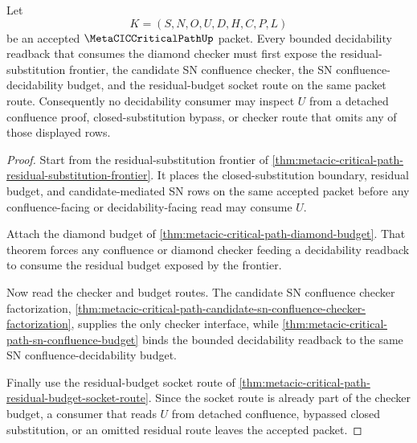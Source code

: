 \begin{theorem}
\label{thm:metacic-critical-path-residual-decidability-cut}
Let
$$
K=(S,N,O,U,D,H,C,P,L)
$$
be an accepted $\MetaCICCriticalPathUp$ packet. Every bounded decidability readback that consumes the diamond checker must first expose the residual-substitution frontier, the candidate SN confluence checker, the SN confluence-decidability budget, and the residual-budget socket route on the same packet route. Consequently no decidability consumer may inspect $U$ from a detached confluence proof, closed-substitution bypass, or checker route that omits any of those displayed rows.
\end{theorem}
\begin{proof}
Start from the residual-substitution frontier of \autoref{thm:metacic-critical-path-residual-substitution-frontier}. It places the closed-substitution boundary, residual budget, and candidate-mediated SN rows on the same accepted packet before any confluence-facing or decidability-facing read may consume $U$.

Attach the diamond budget of \autoref{thm:metacic-critical-path-diamond-budget}. That theorem forces any confluence or diamond checker feeding a decidability readback to consume the residual budget exposed by the frontier.

Now read the checker and budget routes. The candidate SN confluence checker factorization, \autoref{thm:metacic-critical-path-candidate-sn-confluence-checker-factorization}, supplies the only checker interface, while \autoref{thm:metacic-critical-path-sn-confluence-budget} binds the bounded decidability readback to the same SN confluence-decidability budget.

Finally use the residual-budget socket route of \autoref{thm:metacic-critical-path-residual-budget-socket-route}. Since the socket route is already part of the checker budget, a consumer that reads $U$ from detached confluence, bypassed closed substitution, or an omitted residual route leaves the accepted packet.
\end{proof}

